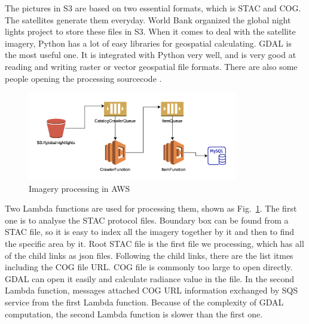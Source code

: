 \documentclass[conference]{IEEEtran}
\begin{document}
The pictures in S3 are based on two essential formats, which is STAC and COG. The satellites generate them everyday. 
World Bank organized the global night lights project to store these files in S3. When it comes to deal with the satellite 
imagery, Python has a lot of easy libraries for geospatial calculating. GDAL is the most useful one. 
It is integrated with Python very well, and is very good at reading and writing raster or vector geospatial file formats.
There are also some people opening the processing sourcecode \cite{Howtopro5:online}.


\begin{figure}[htbp]
    \centerline{\includegraphics[width=260pt]{images/dataprocess.png}}
    \caption{Imagery processing in AWS}
    \label{fig4}
\end{figure}

Two Lambda functions are used for processing them, shown as Fig.~\ref{fig4}. The first one is to analyse the STAC protocol files. Boundary box can be found from a STAC file, so it is easy to index
all the imagery together by it and then to find the specific area by it. Root STAC file is the first file we processing, which has all of the child links as json files. 
Following the child links, there are the list itmes including the COG file URL. COG file is commonly too large to open directly. GDAL can open it easily and calculate radiance 
value in the file. In the second Lambda function, messages attached COG URL information exchanged by SQS service from the first Lambda function. Because of the complexity 
of GDAL computation, the second Lambda function is slower than the first one.
\end{document}
